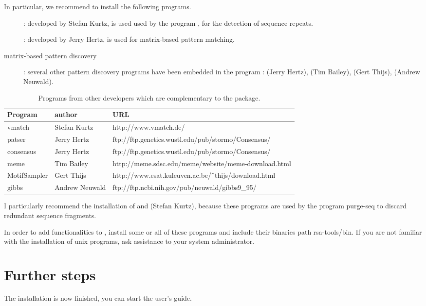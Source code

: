 \documentclass{article}
\begin{document}
In particular, we recommend to install the following programs.

\begin{description}
\item[]: developed by Stefan Kurtz, is used used by the
program , for the detection of sequence repeats.

\item[]: developed by Jerry Hertz, is used for
  matrix-based pattern matching.

\item[matrix-based pattern discovery]: several other pattern discovery
  programs have been embedded in the \RSAT program
  : 
 (Jerry Hertz),
 (Tim Bailey),
 (Gert Thijs),
 (Andrew Neuwald).

\end{description}


\begin{table}
\begin{center}
\begin{tabular}{lll}
\hline
Program & author  & URL \\
\hline
vmatch & Stefan Kurtz & http://www.vmatch.de/ \\
patser & Jerry Hertz & ftp://ftp.genetics.wustl.edu/pub/stormo/Consensus/ \\
consensus & Jerry Hertz &  ftp://ftp.genetics.wustl.edu/pub/stormo/Consensus/ \\
meme & Tim Bailey & http://meme.sdsc.edu/meme/website/meme-download.html \\
MotifSampler & Gert Thijs & http://www.esat.kuleuven.ac.be/$\tilde{\hspace{0.4em}}$thijs/download.html \\
gibbs & Andrew Neuwald & ftp://ftp.ncbi.nih.gov/pub/neuwald/gibbs9\_95/ \\
\hline
\end{tabular}
\end{center}
\caption{\label{table:other_programs} Programs from other developers
  which are complementary to the \RSAT package.}
\end{table}

I particularly recommend the installation of  and
 (Stefan Kurtz), because these programs are used by
the program purge-seq to discard redundant sequence fragments.

In order to add functionalities to \RSAT, install some or all of these
programs and include their binaries path rsa-tools/bin. If you are not
familiar with the installation of unix programs, ask assistance to
your system administrator.


\section{Further steps}

The installation is now finished, you can start the user's guide. 
\end{document}
